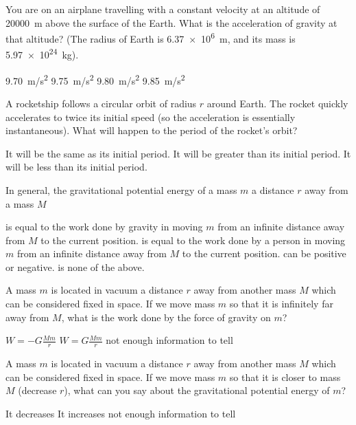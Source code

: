 \question You are on an airplane travelling with a constant velocity at an altitude of \SI{20000}{m} above the surface of the Earth. What is the acceleration of gravity at that altitude? (The radius of Earth is \SI{6.37e6}{m}, and its mass is \SI{5.97e24}{kg}).
\begin{checkboxes} 
\choice \SI{9.70}{m/s^2}
\CorrectChoice \SI{9.75}{m/s^2} \correct
\choice \SI{9.80}{m/s^2}
\choice \SI{9.85}{m/s^2}
\end{checkboxes}

\question A rocketship follows a circular orbit of radius $r$ around Earth. The rocket quickly accelerates to twice its initial speed (so the acceleration is essentially instantaneous). What will happen to the period of the rocket's orbit?
\begin{checkboxes}
\choice It will be the same as its initial period.
\CorrectChoice It will be greater than its initial period. \correct
\choice It will be less than its initial period. 
\end{checkboxes}

\question In general, the gravitational potential energy of a mass $m$ a distance $r$ away from a mass $M$
\begin{checkboxes}
\choice is equal to the work done by gravity in moving $m$ from an infinite distance away from $M$ to the current position.
\choice is equal to the work done by a person in moving $m$ from an infinite distance away from $M$ to the current position.
\CorrectChoice can be positive or negative.
\choice is none of the above.
\end{checkboxes}


\question A mass $m$ is located in vacuum a distance $r$ away from another mass $M$ which can be considered fixed in space. If we move mass $m$ so that it is infinitely far away from $M$, what is the work done by the force of gravity on $m$?
\begin{checkboxes}
\CorrectChoice $W=-G\frac{Mm}{r}$
\choice  $W=G\frac{Mm}{r}$
\choice not enough information to tell
\end{checkboxes}

\question A mass $m$ is located in vacuum a distance $r$ away from another mass $M$ which can be considered fixed in space. If we move mass $m$ so that it is closer to mass $M$ (decrease $r$), what can you say about the gravitational potential energy of $m$?
\begin{checkboxes}
\CorrectChoice It decreases
\choice  It increases
\choice not enough information to tell
\end{checkboxes}

